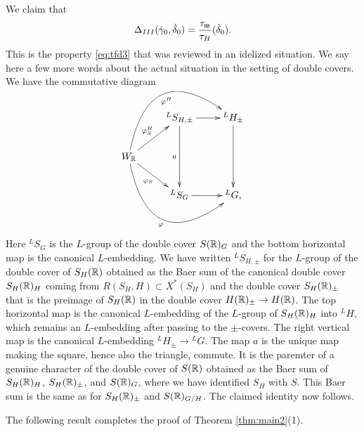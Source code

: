 \documentclass{article}
\theoremstyle{definition}
\numberwithin{equation}{section}
\renewcommand{\-}{\hyp{}}
\begin{document}
We claim that
\[ \Delta_{III}(\dot\gamma_0,\dot\delta_0) = \frac{\tau_{\mathfrak{w}}}{\tau_H}(\dot\delta_0). \]
This is the property \eqref{eq:tfd3} that was reviewed in an idelized situation. We say here a few more words about the actual situation in the setting of double covers. We have the commutative diagram
\[ \xymatrix{
	&^LS_{H,\pm}\ar[dd]_a\ar[r]&^LH_\pm\ar[dd]\\
	W_\R\ar[ru]^{\varphi^H_S}\ar@/^4pc/[rru]_-{\varphi^H}\ar[rd]_{\varphi_S}\ar@/_4pc/[rrd]_-{\varphi}\\
	&^LS_G\ar[r]&^LG,
}
\]
Here $^LS_G$ is the $L$\-group of the double cover $S(\mathbb{R})_G$ and the bottom horizontal map is the canonical $L$\-embedding. We have written $^LS_{H,\pm}$ for the $L$\-group of the double cover of $S_H(\mathbb{R})$ obtained as the Baer sum of the canonical double cover $S_H(\mathbb{R})_H$ coming from $R(S_H,H) \subset X^*(S_H)$ and the double cover $S_H(\mathbb{R})_\pm$ that is the preimage of $S_H(\mathbb{R})$ in the double cover $H(\mathbb{R})_\pm \to H(\mathbb{R})$. The top horizontal map is the canonical $L$\-embedding of the $L$\-group of $S_H(\mathbb{R})_H$ into $^LH$, which remains an $L$\-embedding after passing to the $\pm$-covers. The right vertical map is the canonical $L$\-embedding $^LH_\pm \to {^LG}$. The map $a$ is the unique map making the square, hence also the triangle, commute. It is the paremter of a genuine character of the double cover of $S(\mathbb{R})$ obtained as the Baer sum of $S_H(\mathbb{R})_H$, $S_H(\mathbb{R})_\pm$, and $S(\mathbb{R})_G$, where we have identified $S_H$ with $S$. This Baer sum is the same as for $S_H(\mathbb{R})_\pm$ and $S(\mathbb{R})_{G/H}$. The claimed identity now follows.

The following result completes the proof of Theorem \ref{thm:main2}(1).
\end{document}
